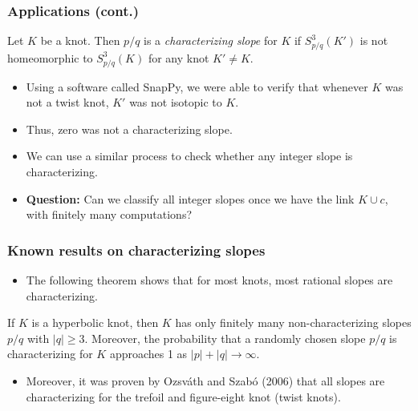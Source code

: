 \documentclass{beamer}
\theoremstyle{ex}
\theoremstyle{rem}
\begin{document}
	\begin{frame}
		\frametitle{Applications (cont.)}
		\begin{definition}
			Let $K$ be a knot. Then $p/q$ is a \textit{characterizing slope} for $K$ if $S^3_{p/q}(K')$ is not homeomorphic to $S^3_{p/q}(K)$ for any knot $K'\ne K$.
		\end{definition}
		
	\begin{itemize}
		\item Using a software called SnapPy, we were able to verify that whenever $K$ was not a twist knot, $K'$ was not isotopic to $K$. 
		\item Thus, zero was not a characterizing slope.
		\item We can use a similar process to check whether any integer slope is characterizing.
	\end{itemize}
	
	\begin{itemize}
		\item \textbf{Question:} Can we classify all integer slopes once we have the link $K\cup c$, with finitely many computations?
	\end{itemize}
\end{frame}

	\begin{frame}
		\frametitle{Known results on characterizing slopes}
		\begin{itemize}
			\item The following theorem shows that for most knots, most rational slopes are characterizing.
		\end{itemize}
		\begin{theorem}[McCoy, 2018]
			If $K$ is a hyperbolic knot, then $K$ has only finitely many non-characterizing slopes $p/q$ with $|q|\geq 3$. Moreover, the probability that a randomly chosen slope $p/q$ is characterizing for $K$ approaches 1 as $|p|+|q|\to\infty$.
		\end{theorem}
		\begin{itemize}
			\item Moreover, it was proven by Ozsv\'{a}th and Szab\'{o} (2006) that all slopes are characterizing for the trefoil and figure-eight knot (twist knots).
		\end{itemize}
	\end{frame}
	
\end{document}
